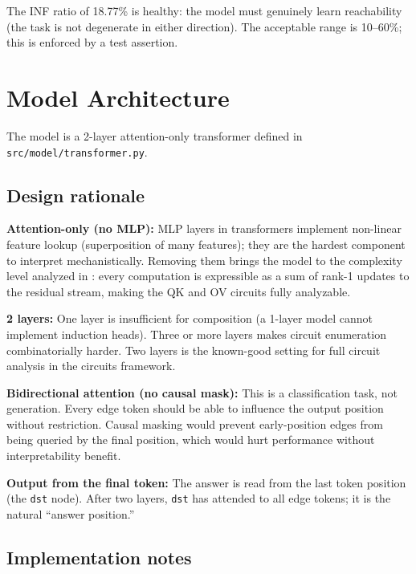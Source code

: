 \documentclass[11pt, a4paper]{article}
\begin{document}
The INF ratio of 18.77\% is healthy: the model must genuinely learn
reachability (the task is not degenerate in either direction). The acceptable
range is 10--60\%; this is enforced by a test assertion.

\section{Model Architecture}

The model is a 2-layer attention-only transformer defined in
\texttt{src/model/transformer.py}.

\subsection{Design rationale}

\textbf{Attention-only (no MLP):} MLP layers in transformers implement
non-linear feature lookup (superposition of many features); they are the
hardest component to interpret mechanistically. Removing them brings the model
to the complexity level analyzed in \cite{elhage2021mathematical}: every
computation is expressible as a sum of rank-1 updates to the residual stream,
making the QK and OV circuits fully analyzable.

\textbf{2 layers:} One layer is insufficient for composition (a 1-layer model
cannot implement induction heads). Three or more layers makes circuit
enumeration combinatorially harder. Two layers is the known-good setting for
full circuit analysis in the circuits framework.

\textbf{Bidirectional attention (no causal mask):} This is a classification
task, not generation. Every edge token should be able to influence the output
position without restriction. Causal masking would prevent early-position
edges from being queried by the final position, which would hurt performance
without interpretability benefit.

\textbf{Output from the final token:} The answer is read from the last token
position (the \texttt{dst} node). After two layers, \texttt{dst} has attended
to all edge tokens; it is the natural ``answer position.''

\subsection{Implementation notes}
\end{document}
